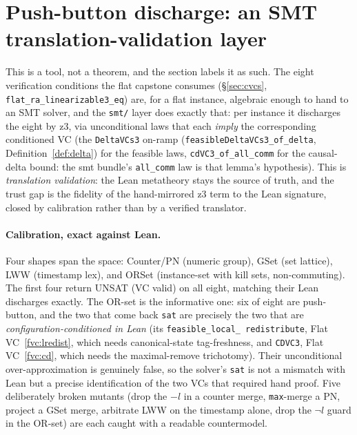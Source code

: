 \documentclass[11pt]{article}
\newcommand{\lean}[1]{\texttt{#1}}
\newcommand{\code}[1]{\texttt{#1}}
\begin{document}
\section{Push-button discharge: an SMT translation-validation layer}
\label{sec:smt}

This is a tool, not a theorem, and the section labels it as such. The
eight verification conditions the flat capstone consumes
(\S\ref{sec:cvcs}, \lean{flat\_ra\_linearizable3\_eq}) are, for a flat
instance, algebraic enough to hand to an SMT solver, and the \code{smt/}
layer does exactly that: per instance it discharges the
eight by z3, via unconditional laws that each \emph{imply} the
corresponding conditioned VC (the \lean{DeltaVCs3} on-ramp
(\lean{feasibleDeltaVCs3\_of\_delta}, Definition~\ref{def:delta}) for
the feasible laws, \lean{cdVC3\_of\_all\_comm} for the causal-delta
bound: the smt bundle's \code{all\_comm} law is that lemma's
hypothesis). This is
\emph{translation validation}: the Lean metatheory stays the source of
truth, and the trust gap is the fidelity of the hand-mirrored z3 term to
the Lean signature, closed by calibration rather than by a verified
translator.

\paragraph{Calibration, exact against Lean.} Four shapes span the space:
Counter/PN (numeric group), GSet (set lattice), LWW (timestamp lex), and
ORSet (instance-set with kill sets, non-commuting). The first four return
UNSAT (VC valid) on all eight, matching their Lean discharges exactly.
The OR-set is the informative one: six of eight are push-button, and the
two that come back \code{sat} are precisely the two that are
\emph{configuration-conditioned in Lean} (its \code{feasible\_local\_%
redistribute}, Flat VC~\ref{fvc:lredist}, which needs canonical-state
tag-freshness, and \code{CDVC3}, Flat VC~\ref{fvc:cd}, which needs the
maximal-remove trichotomy). Their
unconditional over-approximation is genuinely false, so the solver's
\code{sat} is not a mismatch with Lean but a precise identification of the
two VCs that required hand proof. Five deliberately broken mutants (drop
the $-l$ in a counter merge, \code{max}-merge a PN, project a GSet merge,
arbitrate LWW on the timestamp alone, drop the $\neg l$ guard in the
OR-set) are each caught with a readable countermodel.
\end{document}
